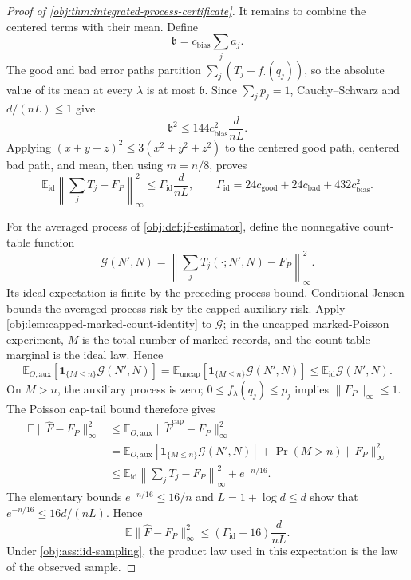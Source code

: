 \documentclass[11pt]{article}
\begin{document}
\begin{proof}[Proof of \cref{obj:thm:integrated-process-certificate}]
It remains to combine the centered terms with their mean. Define
\[
\mathfrak b=c_{\mathrm{bias}}\sum_j a_j.
\]
The good and bad error paths partition \(\sum_j(T_j-f_\cdot(q_j))\), so the absolute value of its mean at every \(\lambda\) is at most \(\mathfrak b\). Since \(\sum_jp_j=1\), Cauchy–Schwarz and \(d/(nL)\leq1\) give
\[
\mathfrak b^2
 \leq144c_{\mathrm{bias}}^2\frac d{nL}.
\]
Applying \((x+y+z)^2\leq3(x^2+y^2+z^2)\) to the centered good path, centered bad path, and mean, then using \(m=n/8\), proves
\[
\mathbb E_{\mathrm{id}}
 \left\|\sum_jT_j-F_P\right\|_\infty^2
 \leq\Gamma_{\mathrm{id}}\frac d{nL},
\qquad
\Gamma_{\mathrm{id}}
 =24c_{\mathrm{good}}+24c_{\mathrm{bad}}
   +432c_{\mathrm{bias}}^2.
\]

For the averaged process of \cref{obj:def:jf-estimator}, define the nonnegative count-table function
\[
\mathcal G(N',N)
 =\left\|\sum_jT_j(\cdot;N',N)-F_P\right\|_\infty^2.
\]
Its ideal expectation is finite by the preceding process bound. Conditional Jensen bounds the averaged-process risk by the capped auxiliary risk. Apply \cref{obj:lem:capped-marked-count-identity} to \(\mathcal G\); in the uncapped marked-Poisson experiment, \(M\) is the total number of marked records, and the count-table marginal is the ideal law. Hence
\[
\mathbb E_{O,\mathrm{aux}}[\mathbf1_{\{M\leq n\}}\mathcal G(N',N)]
 =\mathbb E_{\mathrm{uncap}}[\mathbf1_{\{M\leq n\}}\mathcal G(N',N)]
 \leq\mathbb E_{\mathrm{id}}\mathcal G(N',N).
\]
On \(M>n\), the auxiliary process is zero; \(0\leq f_\lambda(q_j)\leq p_j\) implies \(\|F_P\|_\infty\leq1\). The Poisson cap-tail bound therefore gives
\[
\begin{aligned}
\mathbb E\|\widehat F-F_P\|_\infty^2
&\leq\mathbb E_{O,\mathrm{aux}}\|\widetilde F^{\mathrm{cap}}-F_P\|_\infty^2\\
&=\mathbb E_{O,\mathrm{aux}}[\mathbf1_{\{M\leq n\}}\mathcal G(N',N)]
  +\Pr(M>n)\|F_P\|_\infty^2\\
&\leq\mathbb E_{\mathrm{id}}
       \left\|\sum_jT_j-F_P\right\|_\infty^2
       +e^{-n/16}.
\end{aligned}
\]
The elementary bounds \(e^{-n/16}\leq16/n\) and
\(L=1+\log d\leq d\) show that \(e^{-n/16}\leq16d/(nL)\). Hence
\[
\mathbb E\|\widehat F-F_P\|_\infty^2
 \leq(\Gamma_{\mathrm{id}}+16)\frac d{nL}.
\]
Under \cref{obj:ass:iid-sampling}, the product law used in this expectation is the law of the observed sample. %


\end{proof}
\end{document}

